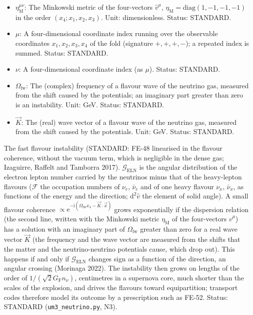 \documentclass[
  10pt,
]{article}
\begin{document}
\begin{itemize}
  STANDARD.
\item
  \(\eta_{\mathrm{M}}^{\mu\nu}\): The Minkowski metric of the
  four-vectors \(\hat v^\mu\),
  \(\eta_{\mathrm{M}} = \mathrm{diag}(1, -1, -1, -1)\) in the order
  \((x_4; x_1, x_2, x_3)\). Unit: dimensionless. Status: STANDARD.
\item
  \(\mu\): A four-dimensional coordinate index running over the
  observable coordinates \(x_1, x_2, x_3, x_4\) of the fold (signature
  \(+,+,+,-\)); a repeated index is summed. Status: STANDARD.
\item
  \(\nu\): A four-dimensional coordinate index (as \(\mu\)). Status:
  STANDARD.
\item
  \(\Omega_{\mathrm{fw}}\): The (complex) frequency of a flavour wave of
  the neutrino gas, measured from the shift caused by the potentials; an
  imaginary part greater than zero is an instability. Unit: GeV. Status:
  STANDARD.
\item
  \(\vec K\): The (real) wave vector of a flavour wave of the neutrino
  gas, measured from the shift caused by the potentials. Unit: GeV.
  Status: STANDARD.
\end{itemize}

The fast flavour instability (STANDARD: FE-48 linearised in the flavour
coherence, without the vacuum term, which is negligible in the dense
gas; Izaguirre, Raffelt and Tamborra 2017).
\(\mathcal{G}_{\mathrm{ELN}}\) is the angular distribution of the
electron lepton number carried by the neutrinos minus that of the
heavy-lepton flavours (\(\mathcal{F}\) the occupation numbers of
\(\nu_e\), \(\bar\nu_e\) and of one heavy flavour \(\nu_x\),
\(\bar\nu_x\), as functions of the energy and the direction;
\(\mathrm{d}^2\hat v\) the element of solid angle). A small flavour
coherence
\(\propto \mathrm{e}^{-\mathrm{i}(\Omega_{\mathrm{fw}}x_4 - \vec K\cdot\vec x)}\)
grows exponentially if the dispersion relation (the second line, written
with the Minkowski metric \(\eta_{\mathrm{M}}\) of the four-vectors
\(\hat v^\mu\)) has a solution with an imaginary part of
\(\Omega_{\mathrm{fw}}\) greater than zero for a real wave vector
\(\vec K\) (the frequency and the wave vector are measured from the
shifts that the matter and the neutrino-neutrino potentials cause, which
drop out). This happens if and only if \(\mathcal{G}_{\mathrm{ELN}}\)
changes sign as a function of the direction, an angular crossing
(Morinaga 2022). The instability then grows on lengths of the order of
\(1/(\sqrt2G_{\mathrm{F}}n_\nu)\), centimetres in a supernova core, much
shorter than the scales of the explosion, and drives the flavours toward
equipartition; transport codes therefore model its outcome by a
prescription such as FE-52. Status: STANDARD (\texttt{um3\_neutrino.py},
N3).
\end{document}
